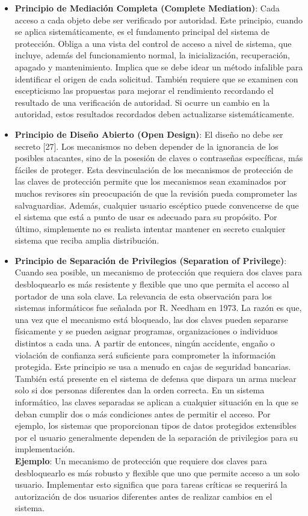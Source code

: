 \begin{itemize}
\item  \textbf{Principio de Mediación Completa (Complete Mediation)}: Cada acceso a cada objeto debe ser verificado por autoridad. Este principio, cuando se aplica sistemáticamente, es el fundamento principal del sistema de protección. Obliga a una vista del control de acceso a nivel de sistema, que incluye, además del funcionamiento normal, la inicialización, recuperación, apagado y mantenimiento. Implica que se debe idear un método infalible para identificar el origen de cada solicitud. También requiere que se examinen con escepticismo las propuestas para mejorar el rendimiento recordando el resultado de una verificación de autoridad. Si ocurre un cambio en la autoridad, estos resultados recordados deben actualizarse sistemáticamente.

\item  \textbf{Principio de Diseño Abierto (Open Design)}: El diseño no debe ser secreto [27]. Los mecanismos no deben depender de la ignorancia de los posibles atacantes, sino de la posesión de claves o contraseñas específicas, más fáciles de proteger. Esta desvinculación de los mecanismos de protección de las claves de protección permite que los mecanismos sean examinados por muchos revisores sin preocupación de que la revisión pueda comprometer las salvaguardias. Además, cualquier usuario escéptico puede convencerse de que el sistema que está a punto de usar es adecuado para su propósito. Por último, simplemente no es realista intentar mantener en secreto cualquier sistema que reciba amplia distribución.\\

\item  \textbf{Principio de Separación de Privilegios (Separation of Privilege)}: Cuando sea posible, un mecanismo de protección que requiera dos claves para desbloquearlo es más resistente y flexible que uno que permita el acceso al portador de una sola clave. La relevancia de esta observación para los sistemas informáticos fue señalada por R. Needham en 1973. La razón es que, una vez que el mecanismo está bloqueado, las dos claves pueden separarse físicamente y se pueden asignar programas, organizaciones o individuos distintos a cada una. A partir de entonces, ningún accidente, engaño o violación de confianza será suficiente para comprometer la información protegida. Este principio se usa a menudo en cajas de seguridad bancarias. También está presente en el sistema de defensa que dispara un arma nuclear solo si dos personas diferentes dan la orden correcta. En un sistema informático, las claves separadas se aplican a cualquier situación en la que se deban cumplir dos o más condiciones antes de permitir el acceso. Por ejemplo, los sistemas que proporcionan tipos de datos protegidos extensibles por el usuario generalmente dependen de la separación de privilegios para su implementación. \\ \textbf{Ejemplo}: Un mecanismo de protección que requiere dos claves para desbloquearlo es más robusto y flexible que uno que permite acceso a un solo usuario. Implementar esto significa que para tareas críticas se requerirá la autorización de dos usuarios diferentes antes de realizar cambios en el sistema.


\end{itemize}
